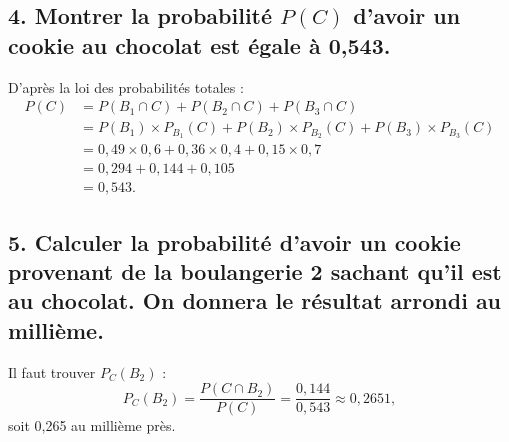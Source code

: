 	\subsection*{4. Montrer la probabilité \(P(C)\) d’avoir un cookie au chocolat est égale à 0,543.}
	
	D’après la loi des probabilités totales :
	\begin{align*}
		P(C) &= P(B_1 \cap C) + P(B_2 \cap C) + P(B_3 \cap C)\\
		& = P(B_1) \times P_{B_1}(C) + P(B_2) \times P_{B_2}(C) + P(B_3) \times P_{B_3}(C) \\
		& = 0,49 \times 0,6 + 0,36 \times 0,4 + 0,15 \times 0,7 \\
	& = 0,294 + 0,144 + 0,105 \\
	&= 0,543. 
	\end{align*}
	
	\subsection*{5. Calculer la probabilité d’avoir un cookie provenant de la boulangerie 2 sachant qu’il est au chocolat. On donnera le résultat arrondi au millième.}
	
	Il faut trouver \(P_C(B_2)\) :
	\[ P_C(B_2) = \dfrac{P(C \cap B_2)}{P(C)} = \dfrac{0,144}{0,543} \approx 0,2651, \]
	soit 0,265 au millième près.
